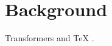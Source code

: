 \documentclass{article}
\begin{document}
\section{Background}
Transformers \cite{vaswani2017} and \TeX{} \cite{knuth1984}.

\end{document}
